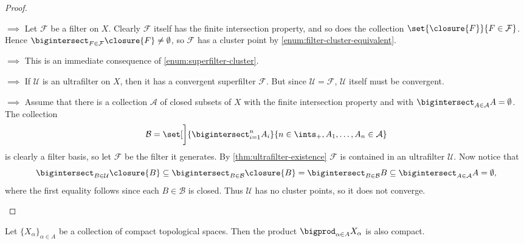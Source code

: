 \documentclass[article, a4paper, 11pt, oneside]{memoir}
\numberwithin{equation}{chapter}
\newcommand{\calU}{\mathcal{U}}
\newcommand{\calB}{\mathcal{B}}
\newcommand{\calF}{\mathcal{F}}
\newcommand{\calA}{\mathcal{A}}
\theoremstyle{nonumberplain}
\begin{document}
\begin{proof}
\begin{proofsec}
    \item[\subcref{enum:space-compact} $\implies$ \subcref{enum:every-filter-cluster}]
    Let $\calF$ be a filter on $X$. Clearly $\calF$ itself has the finite intersection property, and so does the collection $\set{ \closure{F}}{F \in \calF}$. Hence $\bigintersect_{F \in \calF} \closure{F} \neq \emptyset$, so $\calF$ has a cluster point by \cref{enum:filter-cluster-equivalent}.

    \item[\subcref{enum:every-filter-cluster} $\implies$ \subcref{enum:every-filter-convergent-superfilter}]
    This is an immediate consequence of \cref{enum:superfilter-cluster}.

    \item[\subcref{enum:every-filter-convergent-superfilter} $\implies$ \subcref{enum:every-ultrafilter-converges}]
    If $\calU$ is an ultrafilter on $X$, then it has a convergent superfilter $\calF$. But since $\calU = \calF$, $\calU$ itself must be convergent.

    \item[\subcref{enum:every-ultrafilter-converges} $\implies$ \subcref{enum:space-compact}]
    Assume that there is a collection $\calA$ of closed subsets of $X$ with the finite intersection property and with $\bigintersect_{A \in \calA} A = \emptyset$. The collection
    \begin{equation*}
        \calB
            = \set[\bigg]{ \bigintersect_{i=1}^n A_i }{ n \in \ints_+, A_1, \ldots, A_n \in \calA }
    \end{equation*}
    is clearly a filter basis, so let $\calF$ be the filter it generates. By \cref{thm:ultrafilter-existence} $\calF$ is contained in an ultrafilter $\calU$. Now notice that
    \begin{equation*}
        \bigintersect_{B \in \calU} \closure{B}
            \subseteq \bigintersect_{B \in \calB} \closure{B}
            = \bigintersect_{B \in \calB} B
            \subseteq \bigintersect_{A \in \calA} A
            = \emptyset,
    \end{equation*}
    where the first equality follows since each $B \in \calB$ is closed. Thus $\calU$ has no cluster points, so it does not converge.
\end{proofsec}
\end{proof}


\begin{theorem}
    Let $\{X_\alpha\}_{\alpha \in A}$ be a collection of compact topological spaces. Then the product $\bigprod_{\alpha \in A} X_\alpha$ is also compact.
\end{theorem}
\end{document}
